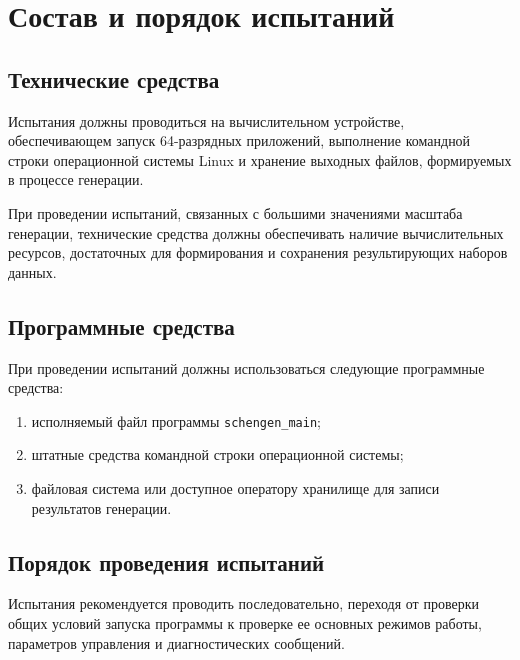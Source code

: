 \section{Состав и порядок испытаний}

\subsection{Технические средства}

Испытания должны проводиться на вычислительном устройстве, обеспечивающем
запуск 64-разрядных приложений, выполнение командной строки операционной
системы Linux и хранение выходных файлов, формируемых в процессе генерации.

При проведении испытаний, связанных с большими значениями масштаба генерации,
технические средства должны обеспечивать наличие вычислительных ресурсов,
достаточных для формирования и сохранения результирующих наборов данных.

\subsection{Программные средства}

При проведении испытаний должны использоваться следующие программные средства:
\begin{enumerate}
    \item исполняемый файл программы \texttt{schengen\_main};
    \item штатные средства командной строки операционной системы;
    \item файловая система или доступное оператору хранилище для записи
    результатов генерации.
\end{enumerate}

\subsection{Порядок проведения испытаний}

Испытания рекомендуется проводить последовательно, переходя от проверки общих
условий запуска программы к проверке ее основных режимов работы, параметров
управления и диагностических сообщений.

